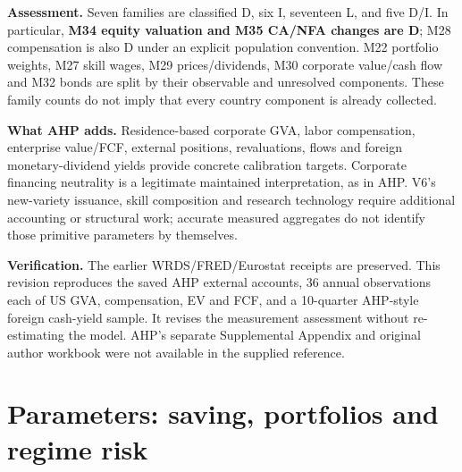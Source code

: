 \documentclass[10pt,a4paper,landscape]{article}
\begin{document}
\textbf{Assessment.} Seven families are classified D, six I, seventeen L, and five D/I. In particular, \textbf{M34 equity valuation and M35 CA/NFA changes are D}; M28 compensation is also D under an explicit population convention. M22 portfolio weights, M27 skill wages, M29 prices/dividends, M30 corporate value/cash flow and M32 bonds are split by their observable and unresolved components. These family counts do not imply that every country component is already collected.

\textbf{What AHP adds.} Residence-based corporate GVA, labor compensation, enterprise value/FCF, external positions, revaluations, flows and foreign monetary-dividend yields provide concrete calibration targets. Corporate financing neutrality is a legitimate maintained interpretation, as in AHP. V6's new-variety issuance, skill composition and research technology require additional accounting or structural work; accurate measured aggregates do not identify those primitive parameters by themselves.

\textbf{Verification.} The earlier WRDS/FRED/Eurostat receipts are preserved. This revision reproduces the saved AHP external accounts, 36 annual observations each of US GVA, compensation, EV and FCF, and a 10-quarter AHP-style foreign cash-yield sample. It revises the measurement assessment without re-estimating the model. AHP's separate Supplemental Appendix and original author workbook were not available in the supplied reference.


\clearpage\section{Parameters: saving, portfolios and regime risk}
\end{document}
